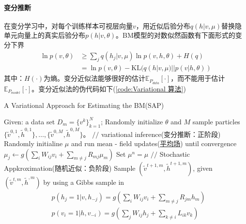 {            \paragraph{变分推断}在变分学习中，对每个训练样本可视层向量$v$，用近似后验分布$q(h|v,\mu)$替换隐单元向量上的真实后验分布$p(h|v,\theta)$。BM模型的对数似然函数有下面形式的变分下界
            \begin{align*}
            \ln p(v,\theta) & \geqslant \sum_j q(h_j|v,\mu)\ln p(v,h,\theta) + H(q)\\
            & =\ln p(v,\theta) - \mathrm{KL}(q(h|v,\mu)||p(v|h,\theta))
            \end{align*}
            其中：$H(\cdot)$为熵。变分近似法能够很好的估计$\mathbb{E}_{P_{data}}[\cdot]$，而不能用于估计$\mathbb{E}_{P_{model}}[\cdot]$。变分近似法的伪代码如下(\ref{code:Variational 算法})
             \begin{algorithm}[htbp]
                \caption{A Variational Approach for Estimating the BM(SAP)}\label{code:Variational 算法}
                \begin{algorithmic}[1]
                    \State Given: a data set $D_m = \{v^k\}_{k=1}^N$; Randomly initialize $\theta$ and $M$ sample particles $\{\tilde{ v}^{0,1},\tilde{h}^{0,1}\},\dots,\{\tilde{ v}^{0,M},\tilde{h}^{0,M}\}$。
                        \State $//$ variational inference(变分推断：正阶段)\cite{1999.Jorden.M}
                            \State Randomly initialine $\mu$ and run mean - field updates(\underline{平均场}) until convergence
                            \State $\mu_j \leftarrow g(\sum_i W_{ij}v_i + \sum_{m\neq j}R_{mj}\mu_m)$
                            \State Set $\mu^n = \mu$
                        \EndFor
                        \State $//$ Stochastic Appkroximation(随机近似：负阶段)
                            \State Sample $(\tilde{v}^{t+1,m},\tilde{h}^{t+1,m})$, given $(\tilde{v}^{t,m},\tilde{h}^{,m})$ by using a Gibbs sample in
                            \begin{align*}
                            & p(h_j=1|v,h_{-j}) = g\left(\sum_iW_{ij}v_i + \sum_{m\neq j}R_{jm}h_m\right)\\
                            & p(v_i=1|h,v_{-i}) = g\left(\sum_jW_{ij}h_j + \sum_{k\neq i}L_{ik}v_k\right)
                            \end{align*}

\end{algorithmic}
\end{algorithm}}
